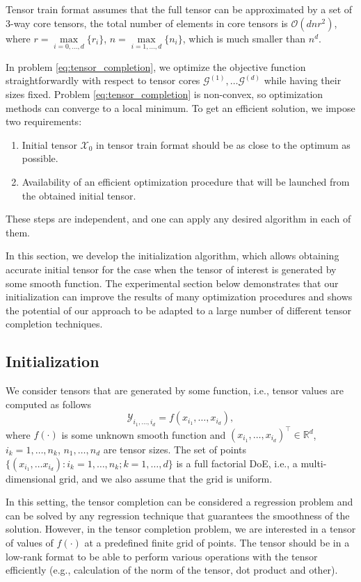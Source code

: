Tensor train format assumes that the full tensor can be approximated by
a set of $3$-way core tensors, the total number of elements in
core tensors is $\mathcal{O}(dnr^2)$, where
$r = \max\limits_{i = 0, \ldots, d}\{r_i\}$,
$n = \max\limits_{i = 1, \ldots, d}\{n_i\}$,
which is much smaller than $n^d$.

In problem \eqref{eq:tensor_completion}, we optimize the objective
function straightforwardly with respect to tensor cores
$\mathcal{G}^{(1)}, \ldots \mathcal{G}^{(d)}$ while having their sizes fixed.
Problem \eqref{eq:tensor_completion} is non-convex, so
optimization methods can converge to a local minimum.
To get an efficient solution, we impose two requirements:
\begin{enumerate}
    \item Initial tensor $\mathcal{X}_0$ in tensor train format should be as close to the optimum as possible.
    \item Availability of an efficient optimization procedure that will be launched from the obtained initial tensor.
\end{enumerate}
These steps are independent, and one can apply any desired algorithm in each of them.

In this section, we develop the initialization algorithm, which allows obtaining accurate initial tensor for the case when the tensor of interest is generated by some smooth function.
The experimental section below demonstrates that our initialization can improve the results of
many optimization procedures and shows the potential of our approach to be adapted
to a large number of different tensor completion techniques.


\subsection{Initialization}
\label{sec:tensor_completion_init}
We consider tensors that are generated by some function,
i.e., tensor values are computed as follows
\[
\mathcal{Y}_{i_1, \ldots, i_d} = f(x_{i_1}, \ldots, x_{i_d}),
\]
where $f(\cdot)$ is some unknown smooth function and
$(x_{i_1}, \ldots, x_{i_d})^\top \in \mathbb{R}^d$,
$i_k = 1, \ldots, n_k$,
$n_1, \ldots, n_d$ are tensor sizes.
The set of points $\{(x_{i_1}, \ldots x_{i_d}): i_k = 1, \ldots, n_k; k = 1, \ldots, d\}$ is a full factorial DoE, i.e., a multi-dimensional grid,
and we also assume that the grid is uniform.

In this setting, the tensor completion can be considered a regression problem and can be solved by any regression technique that guarantees the smoothness of the solution.
However, in the tensor completion problem, we are interested in a tensor of values of $f(\cdot)$ at a predefined finite grid of points.
The tensor should be in a low-rank format to be able to perform various operations with the tensor efficiently (e.g., calculation of the norm of the tensor, dot product and other).

